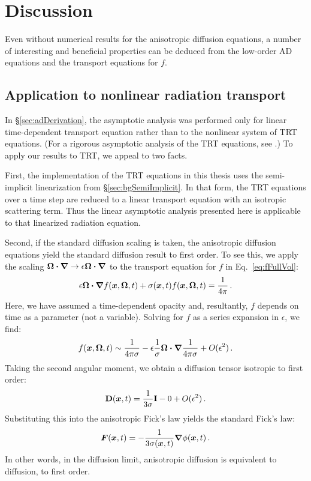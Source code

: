 \section{Discussion}
Even without numerical results for the anisotropic diffusion equations, a
number of interesting and beneficial properties can be deduced from the
low-order AD equations and the transport equations for $f$.

\subsection{Application to nonlinear radiation transport}

In \S\ref{sec:adDerivation}, the asymptotic analysis was performed only for
linear time-dependent transport equation rather than to the nonlinear system of
TRT equations. (For a rigorous asymptotic analysis of the TRT equations, see
\cite{Lar1983a}.) To apply our results to TRT, we appeal to two facts.

First, the implementation of the TRT equations in this thesis uses the
semi-implicit linearization from \S\ref{sec:bgSemiImplicit}. In that form, the
TRT equations over a time step are reduced to a linear transport equation with
an isotropic scattering term. Thus the linear asymptotic analysis presented here
is applicable to that linearized radiation equation.

Second, if the standard diffusion scaling is taken, the anisotropic diffusion
equations yield the standard diffusion result to first order. To see this, we
apply the scaling $\bm{\Omega}\bm{\cdot} \bm{\nabla} \to \epsilon \bm{\Omega}\bm{\cdot} \bm{\nabla}$ to
the transport equation for $f$ in Eq.~\eqref{eq:fFullVol}:
\begin{equation*}
  \epsilon \bm{\Omega}\bm{\cdot} \bm{\nabla} f(\bm{x}, \bm{\Omega}, t)
  + \sigma(\bm{x},t) f(\bm{x}, \bm{\Omega}, t)
  = \frac{1}{4\pi}\,.
\end{equation*}
Here, we have assumed a time-dependent opacity and, resultantly, $f$ depends on
time as a parameter (not a variable). Solving for $f$ as a series expansion in
$\epsilon$, we find:
\begin{align*}
  f(\bm{x}, \bm{\Omega}, t)
  \sim
  \frac{1}{4\pi \sigma}
  - \epsilon 
  \frac{1}{\sigma} \bm{\Omega}\bm{\cdot} \bm{\nabla} \frac{1}{4\pi \sigma}
  + O( \epsilon^2)\,.
\end{align*}
Taking the second angular moment, we obtain a diffusion tensor isotropic to
first order:
\begin{equation*}
  \mathbf{D}(\bm{x}, t)
  =
  \frac{1}{3 \sigma} \mathbf{I}
  - 0
  + O( \epsilon^2)\,.
\end{equation*}
Substituting this into the anisotropic Fick's law yields the standard Fick's
law:
\begin{equation*}
  \bm{F}(\bm{x},t) = - \frac{1}{3 \sigma(\bm{x},t)} \bm{\nabla} \phi(\bm{x},t)\,.
\end{equation*}
In other words, in the diffusion limit, anisotropic diffusion is equivalent to
diffusion, to first order.

